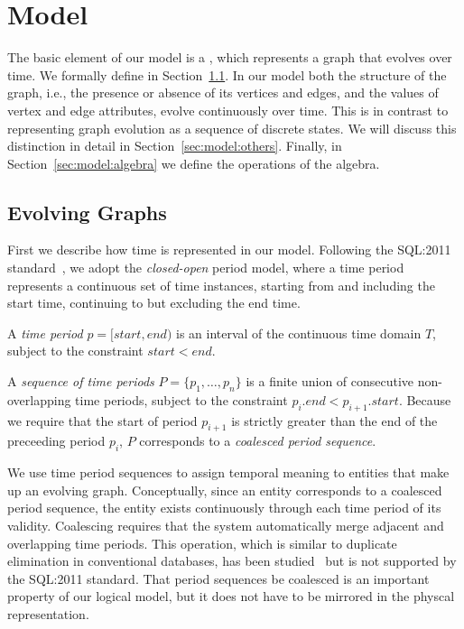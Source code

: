 \section{Model}
\label{sec:model}

The basic element of our model is a \tg, which represents a graph that
evolves over time.  We formally define \tgs in
Section~\ref{sec:model:structure}.  In our model both the structure of
the graph, i.e., the presence or absence of its vertices and edges,
and the values of vertex and edge attributes, evolve continuously over
time.  This is in contrast to representing graph evolution as a
sequence of discrete states.  We will discuss this distinction in
detail in Section~\ref{sec:model:others}.  Finally, in
Section~\ref{sec:model:algebra} we define the operations of the \tg
algebra.

\subsection{Evolving Graphs}
\label{sec:model:structure}

First we describe how time is represented in our model. Following the
SQL:2011 standard~\cite{DBLP:journals/sigmod/KulkarniM12}, we adopt
the {\em closed-open} period model, where a time period represents a
continuous set of time instances, starting from and including the
start time, continuing to but excluding the end time.

\begin{definition}
A {\em time period} $p = [start, end)$ is an interval of the
  continuous time domain $T$, subject to the constraint $start < end$.
\label{def:period} 
\end{definition}

\begin{definition}
A {\em sequence of time periods} $P = \{p_1, \ldots, p_n \}$ is a
finite union of consecutive non-overlapping time periods, subject to
the constraint $p_i.end < p_{i+1}.start$.  Because we require that the
start of period $p_{i+1}$ is strictly greater than the end of the
preceeding period $p_i$, $P$ corresponds to a {\em coalesced period
  sequence}.
\label{def:seq}
\end{definition}

We use time period sequences to assign temporal meaning to entities
that make up an evolving graph.  Conceptually, since an entity
corresponds to a coalesced period sequence, the entity exists
continuously through each time period of its validity.  Coalescing
requires that the system automatically merge adjacent and overlapping
time periods.  This operation, which is similar to duplicate
elimination in conventional databases, has been
studied~\cite{DBLP:conf/vldb/BohlenSS96,DBLP:journals/sigmod/Zimanyi06}
but is not supported by the SQL:2011 standard.  That period sequences
be coalesced is an important property of our logical model, but it
does not have to be mirrored in the physcal representation.


